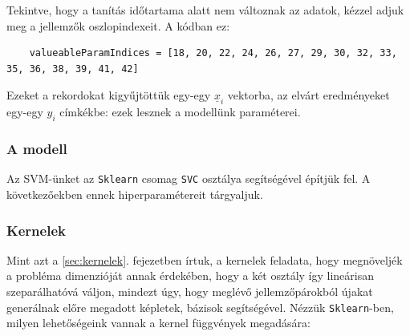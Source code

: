 Tekintve, hogy a tanítás időtartama alatt nem változnak az adatok, kézzel adjuk
meg a jellemzők oszlopindexeit. A kódban ez:
\begin{lstlisting}  
	valueableParamIndices = [18, 20, 22, 24, 26, 27, 29, 30, 32, 33, 35, 36, 38, 39, 41, 42]
\end{lstlisting}

Ezeket a rekordokat kigyűjtöttük egy-egy $ \underline{x}_i $ vektorba, az elvárt eredményeket egy-egy $ y_i $ címkékbe:
ezek lesznek a modellünk paraméterei.



\subsubsection{A modell}

Az SVM-ünket az \texttt{Sklearn} csomag \texttt{SVC} osztálya segítségével építjük fel. A következőekben ennek hiperparamétereit tárgyaljuk.

%
%
%
%




\subsubsection{Kernelek}


Mint azt a \ref{sec:kernelek}. fejezetben írtuk, a kernelek feladata, hogy megnöveljék a probléma
dimenzióját annak érdekében, hogy a két osztály így lineárisan szeparálhatóvá váljon, mindezt 
úgy, hogy meglévő jellemzőpárokból újakat generálnak előre megadott képletek,
bázisok segítségével. Nézzük \texttt{Sklearn}-ben, milyen lehetőségeink vannak a 
kernel függvények megadására:

